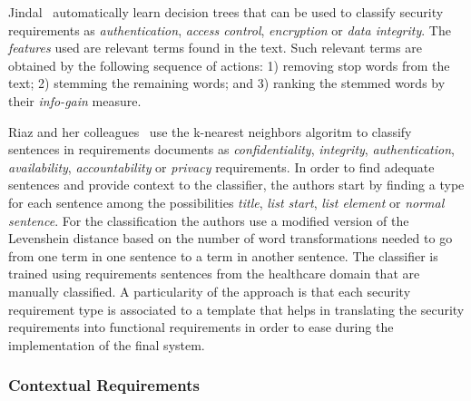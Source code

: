 Jindal\etal~\cite{Jildal:2016} automatically learn decision trees that can be
used to classify security requirements as \emph{authentication}, \emph{access
control}, \emph{encryption} or \emph{data integrity}. The \emph{features} used
are relevant terms found in the text. Such relevant terms are obtained by the
following sequence of actions: 1) removing stop words from the text; 2) stemming
the remaining words; and 3) ranking the stemmed words by their \emph{info-gain}
measure.

Riaz and her colleagues~\cite{Riaz:2014} use the k-nearest neighbors algoritm to
classify sentences in requirements documents as \emph{confidentiality},
\emph{integrity}, \emph{authentication}, \emph{availability},
\emph{accountability} or \emph{privacy} requirements. In order to find
adequate sentences and provide context to the classifier, the authors start by
finding a type for each sentence among the possibilities \emph{title}, \emph{list start}, \emph{list
element} or \emph{normal sentence}. For the classification the authors use a
modified version of the Levenshein distance based on the number of word transformations needed to go
from one term in one sentence to a term in another sentence. The classifier is
trained using requirements sentences from the healthcare domain that are
manually classified. A particularity of the approach is that each security
requirement type is associated to a template that helps in translating the
security requirements into functional requirements in order to ease during the
implementation of the final system. 


\cite{Knauss:2011} 

\subsubsection{Contextual Requirements} 

